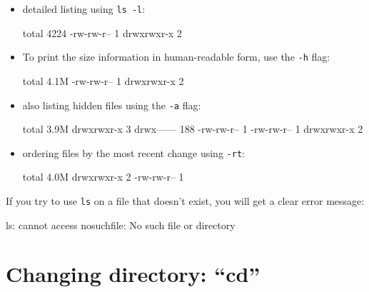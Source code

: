 \begin{itemize}
\item detailed listing using \verb|ls -l|:

\begin{prompt}
total 4224
-rw-rw-r-- 1 %
drwxrwxr-x 2 %
\end{prompt}

\item To print the size information in human-readable form, use the \verb|-h| flag:

\begin{prompt}
total 4.1M
-rw-rw-r-- 1 %
drwxrwxr-x 2 %
\end{prompt}

\item also listing hidden files using the \verb|-a| flag:

\begin{prompt}
total 3.9M
drwxrwxr-x   3 %
drwx------ 188 %
-rw-rw-r--   1 %
-rw-rw-r--   1 %
drwxrwxr-x   2 %
\end{prompt}

\item ordering files by the most recent change using \verb|-rt|:

\begin{prompt}
total 4.0M
drwxrwxr-x 2 %
-rw-rw-r-- 1 %
\end{prompt}

\end{itemize}

If you try to use \verb|ls| on a file that doesn't exist, you will get a clear error message:

\begin{prompt}
ls: cannot access nosuchfile: No such file or directory
\end{prompt}

\section{Changing directory: ``cd''}

